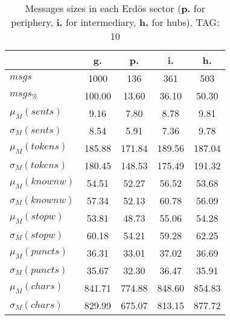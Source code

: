 \begin{table}[h!]
\begin{center}
\begin{tabular}{| l || c | c | c | c |}\hline
 & {\bf g.} & {\bf p.} & {\bf i.} & {\bf h.} \\\hline\hline
$msgs$ & 1000  & 136  & 361  & 503 \\
$msgs_{\%}$ & 100.00  & 13.60  & 36.10  & 50.30 \\\hline
$\mu_M(sents)$ & 9.16  & 7.80  & 8.78  & 9.81 \\
$\sigma_M(sents)$ & 8.54  & 5.91  & 7.36  & 9.78 \\\hline
$\mu_M(tokens)$ & 185.88  & 171.84  & 189.56  & 187.04 \\
$\sigma_M(tokens)$ & 180.45  & 148.53  & 175.49  & 191.32 \\\hline
$\mu_M(knownw)$ & 54.51  & 52.27  & 56.52  & 53.68 \\
$\sigma_M(knownw)$ & 57.34  & 52.13  & 60.78  & 56.09 \\\hline
$\mu_M(stopw)$ & 53.81  & 48.73  & 55.06  & 54.28 \\
$\sigma_M(stopw)$ & 60.18  & 54.21  & 59.28  & 62.25 \\\hline
$\mu_M(puncts)$ & 36.31  & 33.01  & 37.02  & 36.69 \\
$\sigma_M(puncts)$ & 35.67  & 32.30  & 36.47  & 35.91 \\\hline
$\mu_M(chars)$ & 841.71  & 774.88  & 848.60  & 854.83 \\
$\sigma_M(chars)$ & 829.99  & 675.07  & 813.15  & 877.72 \\\hline
\end{tabular}
\caption{Messages sizes in each Erd\"os sector ({{\bf p.}} for periphery, {{\bf i.}} for intermediary, {{\bf h.}} for hubs). TAG: 10}
\end{center}
\end{table}